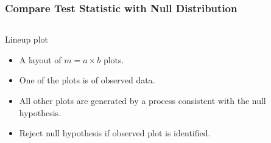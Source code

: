 \documentclass{beamer}
\begin{document}
\begin{frame}
  \frametitle{Compare Test Statistic with Null Distribution}
	\begin{columns}
		\begin{column}{0.4\textwidth} Lineup plot
		  \begin{itemize}
			  \item A layout of $m=a \times b$ plots.
			  \item One of the plots is of observed data.
			  \item All other plots are generated by a process consistent with the null hypothesis.
			  \item Reject null hypothesis if observed plot is identified.
		  \end{itemize}		
			
		\end{column}
		
		\begin{column}{0.6\textwidth}
			 \begin{center}  \end{center}
		\end{column}
	\end{columns}  
\end{frame}
\end{document}
